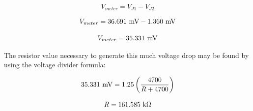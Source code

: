 $$V_{meter} = V_{J1} - V_{J2}$$

$$V_{meter} = 36.691 \hbox{ mV} - 1.360 \hbox{ mV}$$

$$V_{meter} = 35.331 \hbox{ mV}$$

The resistor value necessary to generate this much voltage drop may be found by using the voltage divider formula:

$$35.331 \hbox{ mV} = 1.25 \left( {4700 \over R + 4700} \right)$$

$$R = 161.585 \hbox{ k}\Omega$$




